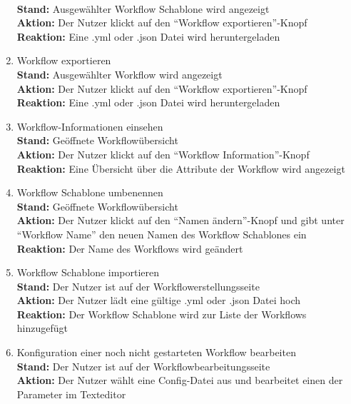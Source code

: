 \begin{enumerate}
        \\ \textbf{Stand:} Ausgewählter \gls{Workflow Schablone} wird angezeigt
        \\ \textbf{Aktion:} Der \gls{Nutzer} klickt auf den \enquote{Workflow exportieren}-Knopf
        \\ \textbf{Reaktion:} Eine .yml oder .json Datei wird heruntergeladen
    \item \gls{Workflow} exportieren
        \\ \textbf{Stand:} Ausgewählter \gls{Workflow} wird angezeigt
        \\ \textbf{Aktion:} Der \gls{Nutzer} klickt auf den \enquote{Workflow exportieren}-Knopf
        \\ \textbf{Reaktion:} Eine .yml oder .json Datei wird heruntergeladen
    \item \gls{Workflow}-Informationen einsehen
        \\ \textbf{Stand:} Geöffnete Workflowübersicht
        \\ \textbf{Aktion:} Der \gls{Nutzer} klickt auf den \enquote{Workflow Information}-Knopf
        \\ \textbf{Reaktion:} Eine Übersicht über die Attribute der \gls{Workflow} wird angezeigt
    \item \gls{Workflow Schablone} umbenennen
        \\ \textbf{Stand:} Geöffnete Workflowübersicht
        \\ \textbf{Aktion:} Der \gls{Nutzer} klickt auf den \enquote{Namen ändern}-Knopf und gibt unter \enquote{Workflow Name} den neuen Namen des \glspl{Workflow Schablone} ein
        \\ \textbf{Reaktion:} Der Name des Workflows wird geändert
    \item \gls{Workflow Schablone} importieren
        \\ \textbf{Stand:} Der \gls{Nutzer} ist auf der Workflowerstellungsseite 
        \\ \textbf{Aktion:} Der \gls{Nutzer} lädt eine gültige .yml oder .json Datei hoch 
        \\ \textbf{Reaktion:} Der \gls{Workflow Schablone} wird zur Liste der Workflows hinzugefügt
    \item Konfiguration einer noch nicht gestarteten \gls{Workflow} bearbeiten
        \\ \textbf{Stand:} Der \gls{Nutzer} ist auf der Workflowbearbeitungsseite
        \\ \textbf{Aktion:} Der \gls{Nutzer} wählt eine Config-Datei aus und bearbeitet einen der Parameter im Texteditor

\end{enumerate}
